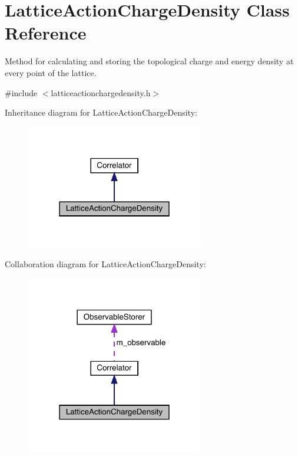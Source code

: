 \hypertarget{class_lattice_action_charge_density}{}\section{Lattice\+Action\+Charge\+Density Class Reference}
\label{class_lattice_action_charge_density}


Method for calculating and storing the topological charge and energy density at every point of the lattice.  




{\ttfamily \#include $<$latticeactionchargedensity.\+h$>$}



Inheritance diagram for Lattice\+Action\+Charge\+Density\+:\nopagebreak
\begin{figure}[H]
\begin{center}
\leavevmode
\includegraphics[width=219pt]{class_lattice_action_charge_density__inherit__graph}
\end{center}
\end{figure}


Collaboration diagram for Lattice\+Action\+Charge\+Density\+:\nopagebreak
\begin{figure}[H]
\begin{center}
\leavevmode
\includegraphics[width=219pt]{class_lattice_action_charge_density__coll__graph}
\end{center}
\end{figure}
